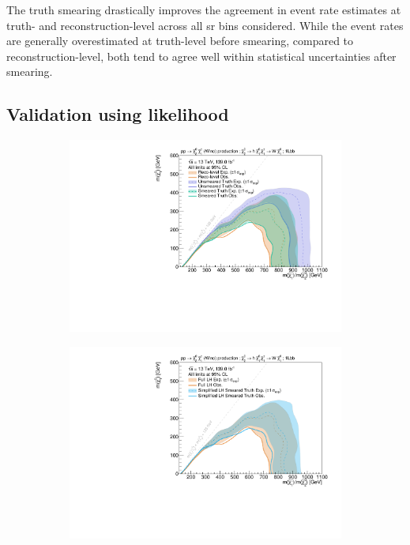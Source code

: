 The truth smearing drastically improves the agreement in event rate estimates at truth- and reconstruction-level across all \gls{sr} bins considered. While the event rates are generally overestimated at truth-level before smearing, compared to reconstruction-level, both tend to agree well within statistical uncertainties after smearing. 
 
\subsection{Validation using likelihood}


 \begin{figure}
	\centering
	\begin{subfigure}[b]{0.49\linewidth}
		\centering\includegraphics[width=\textwidth]{exclusion_1Lbb_truthInput_compareReco_BkgOnly_noLabel}
		\caption{\label{fig:full_truth_result}}
	\end{subfigure}\hfill
	\begin{subfigure}[b]{0.49\linewidth}
		\centering\includegraphics[width=\textwidth]{exclusion_1Lbb_truthInput_BkgSignal_700_200_noLabel}

\end{subfigure}
\end{figure}
